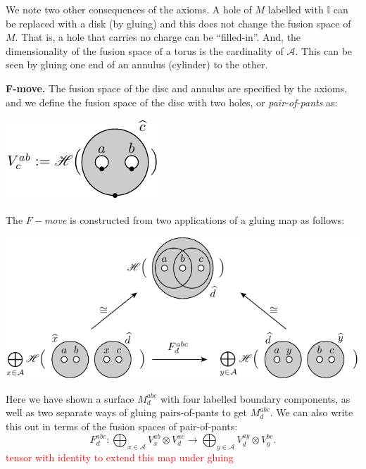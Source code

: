 \documentclass[aps, prl, letterpaper, twocolumn, superscriptaddress, notitlepage, 10pt]{revtex4-1}
\newcommand{\vac}{\mathbb{I}}
\newcommand{\simon}[1]{\textcolor{red}{#1}}
\newcommand{\A}{\mathcal{A}}
\newcommand{\subsub}[1]{{\bf #1}}
\begin{document}
We note two other consequences of the axioms.
A hole of $M$ labelled with $\vac$ can be replaced with a disk (by gluing)
and this does not change the fusion space of $M.$
That is, a hole that carries no charge can be ``filled-in''.
And, the dimensionality of the fusion space of a torus is the
cardinality of $\A.$
This can be seen by gluing one end
of an annulus (cylinder) to the other.

\subsub{F-move.}
The fusion space of the disc and annulus are
specified by the axioms, and we define the fusion
space of the disc with two holes, or \emph{pair-of-pants} as:
\begin{center}
\includegraphics[]{pic-pop.pdf}
\end{center}

The \emph{$F-$move}
is constructed from two applications of a
gluing map as follows:
\begin{center}
\includegraphics[]{pic-glue-fmove.pdf}
\end{center}
Here we have shown a surface $M^{abc}_d$ with 
four labelled boundary components, as well as two separate
ways of gluing pairs-of-pants to get $M^{abc}_d.$
We can also write this out in terms of the fusion spaces of pair-of-pants:
$$
    F^{abc}_d : \bigoplus_{x\in\A} V^{ab}_x\otimes V^{xc}_d 
        \to \bigoplus_{y\in\A} V^{ay}_d\otimes V^{bc}_y.
$$
\simon{tensor with identity to extend this map under gluing}
\end{document}
